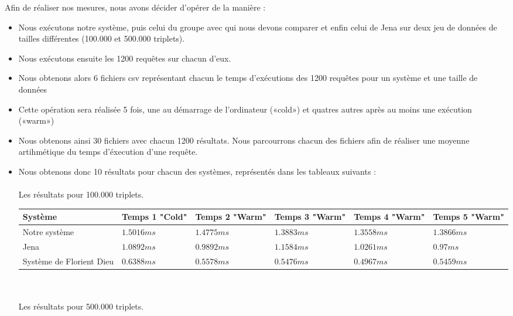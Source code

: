 \documentclass[12pt]{report}
\begin{document}
Afin de réaliser nos mesures, nous avons décider d’opérer de la manière :
\begin{itemize}
\item Nous exécutons notre système, puis celui du groupe avec qui nous devons comparer et enfin celui de Jena sur deux jeu de données de tailles différentes (100.000 et 500.000 triplets).
\item Nous exécutons ensuite les 1200 requêtes sur chacun d’eux. 
\item Nous obtenons alors 6 fichiers csv représentant chacun le temps d'exécutions des 1200 requêtes pour un système et une taille de données
\item Cette opération sera réalisée 5 fois, une au démarrage de l’ordinateur («cold») et  quatres autres après au moins une exécution («warm»)
\item Nous obtenons ainsi 30 fichiers avec chacun 1200 résultats. Nous parcourrons chacun des fichiers afin de réaliser une moyenne artihmétique du temps d'éxecution d'une requête.
\item Nous obtenons donc 10 résultats pour chacun des systèmes, représentés dans les tableaux suivants : 
  \\
  \\
  Les résultats pour 100.000 triplets.
  \\
  \begin{tabular}{|>{\centering\arraybackslash}p{3cm}||>{\centering\arraybackslash}p{2cm}|>{\centering\arraybackslash}p{2cm}|>{\centering\arraybackslash}p{2cm}|>{\centering\arraybackslash}p{2cm}|>{\centering\arraybackslash}p{2cm}|}
    \hline
    \bf Système & \bf Temps 1 "Cold" & \bf Temps 2 "Warm" & \bf Temps 3 "Warm" & \bf Temps 4 "Warm" & \bf Temps 5 "Warm" \\
    \hline
    Notre système & $1.5016 ms$ & $1.4775 ms$ & $1.3883 ms$  & $1.3558 ms$ & $1.3866 ms$\\
    \hline
    Jena& $1.0892 ms$ & $0.9892 ms$ & $1.1584 ms$  & $1.0261 ms$ & $0.97 ms$ \\
    \hline
    Système de Florient Dieu & $0.6388ms$ & $0.5578ms$ &  $0.5476ms$ & $0.4967ms$  & $0.5459ms$ \\
    \hline
  \end{tabular}
  \\
  \\
  Les résultats pour 500.000 triplets.
  \\
  \begin{tabular}{|>{\centering\arraybackslash}p{3cm}||>{\centering\arraybackslash}p{2cm}|>{\centering\arraybackslash}p{2cm}|>{\centering\arraybackslash}p{2cm}|>{\centering\arraybackslash}p{2cm}|>{\centering\arraybackslash}p{2cm}|}

\end{tabular}
\end{itemize}
\end{document}
